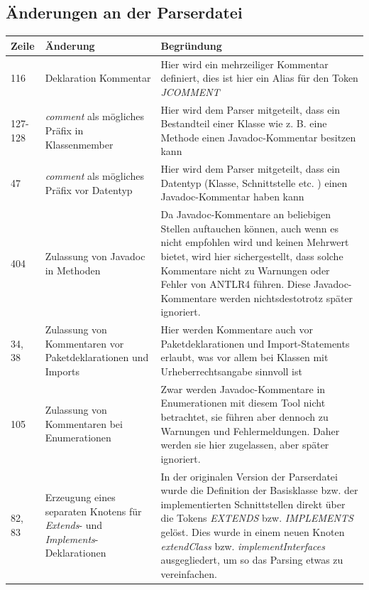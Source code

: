 
\renewcommand\appendixpagename{Anhänge}
\begin{appendices}


\chapter{Änderungen an der Parserdatei}
\begin{table}[h!]
    \centering
    \begin{tabular}{m{0.75cm}|m{4cm}|m{10cm}}
        \textbf{Zeile} & \textbf{Änderung} & \textbf{Begründung} \\
         \hline
        116 & Deklaration Kommentar & Hier wird ein mehrzeiliger Kommentar definiert, dies ist hier ein Alias für den Token \textit{JCOMMENT}\\
        \hline
        127-128 & \textit{comment} als mögliches Präfix in Klassenmember & Hier wird dem Parser mitgeteilt, dass ein Bestandteil einer Klasse wie z. B. eine Methode einen Javadoc-Kommentar besitzen kann\\
        \hline
        47 & \textit{comment} als mögliches Präfix vor Datentyp & Hier wird dem Parser mitgeteilt, dass ein Datentyp (Klasse, Schnittstelle etc. ) einen Javadoc-Kommentar haben kann \\
        \hline
        404 & Zulassung von Javadoc in Methoden & Da Javadoc-Kommentare an beliebigen Stellen auftauchen können, auch wenn es nicht empfohlen wird und keinen Mehrwert bietet, wird hier sichergestellt, dass solche Kommentare nicht zu Warnungen oder Fehler von ANTLR4 führen. Diese Javadoc-Kommentare werden nichtsdestotrotz später ignoriert.\\
        \hline
        34, 38& Zulassung von Kommentaren vor Paketdeklarationen und Imports & Hier werden Kommentare auch vor Paketdeklarationen und Import-Statements erlaubt, was vor allem bei Klassen mit Urheberrechtsangabe sinnvoll ist\\
        \hline
        105 & Zulassung von Kommentaren bei Enumerationen & Zwar werden Javadoc-Kommentare in Enumerationen mit diesem Tool nicht betrachtet, sie führen aber dennoch zu Warnungen und Fehlermeldungen. Daher werden sie hier zugelassen, aber später ignoriert. \\
        \hline
        82, 83 & Erzeugung eines separaten Knotens für \textit{Extends}- und \textit{Implements}-Deklarationen & In der originalen Version der Parserdatei wurde die Definition der Basisklasse bzw. der implementierten Schnittstellen direkt über die Tokens \textit{EXTENDS} bzw. \textit{IMPLEMENTS} gelöst. Dies wurde in einem neuen Knoten \textit{extendClass} bzw. \textit{implementInterfaces} ausgegliedert, um so das Parsing etwas zu vereinfachen.  \\
         

\end{tabular}
\end{table}
\end{appendices}
